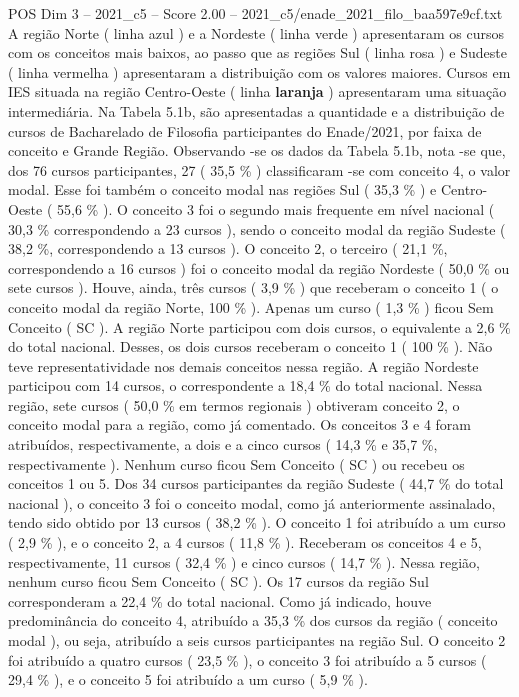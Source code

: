 \begin{textsample}{POS Dim 3 – 2021\_c5 – Score 2.00 – 2021\_c5/enade\_2021\_filo\_baa597e9cf.txt}
A região Norte ( linha azul ) e a Nordeste ( linha verde ) apresentaram os cursos com os conceitos mais baixos, ao passo que as regiões Sul ( linha rosa ) e Sudeste ( linha vermelha ) apresentaram a distribuição com os valores maiores.
Cursos em IES situada na região Centro-Oeste ( linha \textbf{laranja} ) apresentaram uma situação intermediária.
Na Tabela 5.1b, são apresentadas a quantidade e a distribuição de cursos de Bacharelado de Filosofia participantes do Enade/2021, por faixa de conceito e Grande Região.
Observando -se os dados da Tabela 5.1b, nota -se que, dos 76 cursos participantes, 27 ( 35,5 \% ) classificaram -se com conceito 4, o valor modal.
Esse foi também o conceito modal nas regiões Sul ( 35,3 \% ) e Centro-Oeste ( 55,6 \% ).
O conceito 3 foi o segundo mais frequente em nível nacional ( 30,3 \% correspondendo a 23 cursos ), sendo o conceito modal da região Sudeste ( 38,2 \%, correspondendo a 13 cursos ).
O conceito 2, o terceiro ( 21,1 \%, correspondendo a 16 cursos ) foi o conceito modal da região Nordeste ( 50,0 \% ou sete cursos ).
Houve, ainda, três cursos ( 3,9 \% ) que receberam o conceito 1 ( o conceito modal da região Norte, 100 \% ).
Apenas um curso ( 1,3 \% ) ficou Sem Conceito ( SC ).
A região Norte participou com dois cursos, o equivalente a 2,6 \% do total nacional.
Desses, os dois cursos receberam o conceito 1 ( 100 \% ).
Não teve representatividade nos demais conceitos nessa região.
A região Nordeste participou com 14 cursos, o correspondente a 18,4 \% do total nacional.
Nessa região, sete cursos ( 50,0 \% em termos regionais ) obtiveram conceito 2, o conceito modal para a região, como já comentado.
Os conceitos 3 e 4 foram atribuídos, respectivamente, a dois e a cinco cursos ( 14,3 \% e 35,7 \%, respectivamente ).
Nenhum curso ficou Sem Conceito ( SC ) ou recebeu os conceitos 1 ou 5.
Dos 34 cursos participantes da região Sudeste ( 44,7 \% do total nacional ), o conceito 3 foi o conceito modal, como já anteriormente assinalado, tendo sido obtido por 13 cursos ( 38,2 \% ).
O conceito 1 foi atribuído a um curso ( 2,9 \% ), e o conceito 2, a 4 cursos ( 11,8 \% ).
Receberam os conceitos 4 e 5, respectivamente, 11 cursos ( 32,4 \% ) e cinco cursos ( 14,7 \% ).
Nessa região, nenhum curso ficou Sem Conceito ( SC ).
Os 17 cursos da região Sul corresponderam a 22,4 \% do total nacional.
Como já indicado, houve predominância do conceito 4, atribuído a 35,3 \% dos cursos da região ( conceito modal ), ou seja, atribuído a seis cursos participantes na região Sul.
O conceito 2 foi atribuído a quatro cursos ( 23,5 \% ), o conceito 3 foi atribuído a 5 cursos ( 29,4 \% ), e o conceito 5 foi atribuído a um curso ( 5,9 \% ).

\end{textsample}
